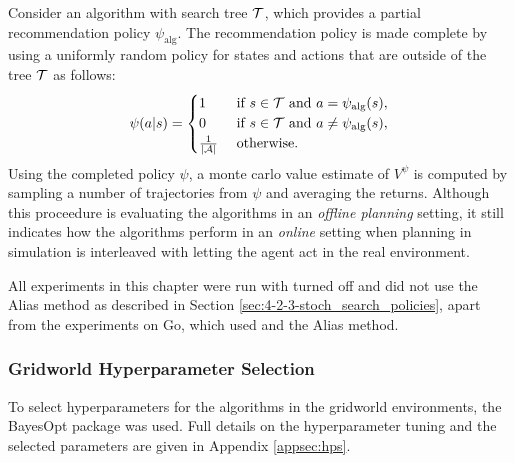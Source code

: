         Consider an algorithm with search tree $\mathcal{T}$, which provides a partial recommendation policy $\psi_{\text{alg}}$. The recommendation policy is made complete by using a uniformly random policy for states and actions that are outside of the tree $\mathcal{T}$ as follows:
        \begin{align}
            \psi(a|s) =
            \begin{cases}
                1                       & \text{ if } s\in\mathcal{T} \text{ and } a=\psi_{\text{alg}}(s), \\
                0                       & \text{ if } s\in\mathcal{T} \text{ and } a\neq\psi_{\text{alg}}(s), \\
                \frac{1}{|\mathcal{A}|}      & \text{ otherwise.}
            \end{cases} \label{eq:full_Recommend}
        \end{align}
        Using the completed policy $\psi$, a monte carlo value estimate of $V^{\psi}$ is computed by sampling a number of trajectories from $\psi$ and averaging the returns.  Although this proceedure is evaluating the algorithms in an \textit{offline planning} setting, it still indicates how the algorithms perform in an \textit{online} setting when planning in simulation is interleaved with letting the agent act in the real environment. 

        All experiments in this chapter were run with \mctsmode\ewe turned off and did not use the Alias method as described in Section \ref{sec:4-2-3-stoch_search_policies}, apart from the experiments on Go, which used \mctsmode and the Alias method.




        \subsubsection{Gridworld Hyperparameter Selection}

            To select hyperparameters for the algorithms in the gridworld environments, the BayesOpt package \cite{bayesopt} was used. Full details on the hyperparameter tuning and the selected parameters are given in Appendix \ref{appsec:hps}.

